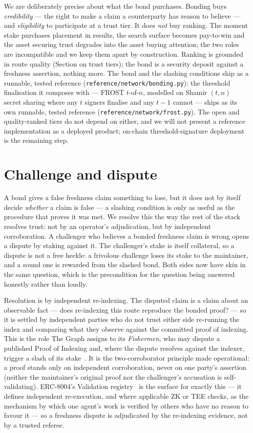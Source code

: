 \documentclass[11pt]{article}
\begin{document}
We are deliberately precise about what the bond purchases. Bonding buys
\emph{credibility} --- the right to make a claim a counterparty has reason to
believe --- and \emph{eligibility} to participate at a trust tier. It does
\emph{not} buy ranking. The moment stake purchases placement in results, the search
surface becomes pay-to-win and the asset securing trust degrades into the asset
buying attention; the two roles are incompatible and we keep them apart by
construction. Ranking is grounded in route quality (Section on trust tiers); the
bond is a security deposit against a freshness assertion, nothing more. The bond and
the slashing conditions ship as a runnable, tested reference
(\texttt{reference/network/bonding.py}); the threshold finalisation it composes with
--- FROST $t$-of-$n$, modelled on Shamir $(t,n)$ secret sharing where any $t$ signers
finalise and any $t-1$ cannot --- ships as its own runnable, tested reference
(\texttt{reference/network/frost.py}). The open and quality-ranked tiers do not depend
on either, and we will not present a reference implementation as a deployed product;
on-chain threshold-signature deployment is the remaining step.

\section{Challenge and dispute}

A bond gives a false freshness claim something to lose, but it does not by itself
decide \emph{whether} a claim is false --- a slashing condition is only as useful
as the procedure that proves it was met. We resolve this the way the rest of the
stack resolves trust: not by an operator's adjudication, but by independent
corroboration. A challenger who believes a bonded freshness claim is wrong opens a
dispute by staking against it. The challenger's stake is itself collateral, so a
dispute is not a free heckle: a frivolous challenge loses its stake to the
maintainer, and a sound one is rewarded from the slashed bond. Both sides now have
skin in the same question, which is the precondition for the question being
answered honestly rather than loudly.

Resolution is by independent re-indexing. The disputed claim is a claim about an
observable fact --- does re-indexing this route reproduce the bonded proof? --- so
it is settled by independent parties who do not trust either side re-running the
index and comparing what they observe against the committed proof of indexing. This
is the role The Graph assigns to its \emph{Fishermen}, who may dispute a published
Proof of Indexing and, where the dispute resolves against the indexer, trigger a
slash of its stake~\cite{thegraph}. It is the two-corroborator principle made
operational: a proof stands only on independent corroboration, never on one party's
assertion (neither the maintainer's original proof nor the challenger's accusation
is self-validating). ERC-8004's Validation registry~\cite{erc8004} is the surface
for exactly this --- it defines independent re-execution, and where applicable ZK or
TEE checks, as the mechanism by which one agent's work is verified by others who
have no reason to favour it --- so a freshness dispute is adjudicated by the
re-indexing evidence, not by a trusted referee.
\end{document}
